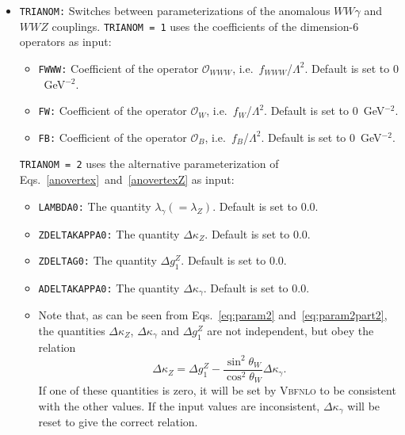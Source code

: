 \documentclass[english,12pt]{article}
\begin{document}
\begin{itemize}
 \item {\tt TRIANOM:} Switches between parameterizations of the anomalous
$WW\gamma$ and $WWZ$ couplings.  {\tt TRIANOM = 1} uses the coefficients of the
dimension-6 operators as input: 
   \begin{itemize}
     \item {\tt FWWW:} Coefficient of the operator $\mathcal{O}_{WWW}$, i.e.\
$f_{WWW}$/$\Lambda^{2}$.  Default is set to $0$~GeV$^{-2}$.
     \item {\tt FW:} Coefficient of the operator $\mathcal{O}_{W}$, i.e.\
$f_{W}$/$\Lambda^{2}$.  Default is set to $0$~GeV$^{-2}$.
     \item {\tt FB:} Coefficient of the operator $\mathcal{O}_{B}$, i.e.\
$f_{B}$/$\Lambda^{2}$.  Default is set to $0$~GeV$^{-2}$.
   \end{itemize}
  {\tt TRIANOM = 2} uses the alternative parameterization of Eqs.~\eqref{anovertex}~and~\eqref{anovertexZ} as input:
   \begin{itemize}
    \item {\tt LAMBDA0:} The quantity $\lambda_{\gamma} (= \lambda_{Z})$. 
Default is set to 0.0.
    \item {\tt ZDELTAKAPPA0:} The quantity $\Delta \kappa_{Z}$.  Default is set
to 0.0.
    \item {\tt ZDELTAG0:} The quantity $\Delta g_{1}^{Z}$.  Default is set to 0.0.
    \item {\tt ADELTAKAPPA0:} The quantity $\Delta \kappa_{\gamma}$.  Default
is set to 0.0.
    \item  Note that, as can be seen from Eqs.~\eqref{eq:param2} and~\eqref{eq:param2part2}, the quantities $\Delta
\kappa_{Z}$, $\Delta \kappa_{\gamma}$ and $\Delta g_{1}^{Z}$ are not
independent, but obey the relation
 \begin{equation}
  \label{eq:anomVconsistency}
  \Delta \kappa_{Z} = \Delta g_{1}^{Z} - \frac{\sin^{2} \theta_{W}}{\cos^{2} \theta_{W}} \Delta \kappa_{\gamma}.
 \end{equation}
 If one of these quantities is zero, it will be set by \textsc{Vbfnlo} to be
consistent with the other values.  If the input values are inconsistent, $\Delta
\kappa_{\gamma}$ will be reset to give the correct relation.
   \end{itemize}


\end{itemize}
\end{document}
